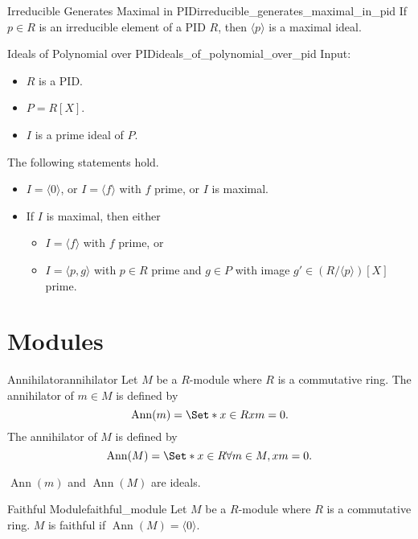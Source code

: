 \documentclass{article}
\begin{document}
\begin{proposition}{Irreducible Generates Maximal in PID}{irreducible_generates_maximal_in_pid}
    If $p\in R$ is an irreducible element of a PID $R$, then $\langle p \rangle$ is a maximal ideal.
\end{proposition}

\begin{theorem}{Ideals of Polynomial over PID}{ideals_of_polynomial_over_pid}
    Input:
    \begin{itemize}
        \item $R$ is a PID.
        \item $P = R[X]$.
        \item $I$ is a prime ideal of $P$.
    \end{itemize}
    The following statements hold.
    \begin{itemize}
        \item $I = \langle 0 \rangle$, or $I = \langle f \rangle$ with $f$ prime, or $I$ is maximal.
        \item If $I$ is maximal, then either
        \begin{itemize}
            \item $I = \langle f \rangle$ with $f$ prime, or
            \item $I = \langle p, g \rangle$ with $p\in R$ prime and $g\in P$ with image $g'\in (R/\langle p \rangle)[X]$ prime.
        \end{itemize}
    \end{itemize}
\end{theorem}

\section{Modules}

\begin{definition}{Annihilator}{annihilator}
    Let $M$ be a $R$-module where $R$ is a commutative ring.
    The annihilator of $m\in M$ is defined by
    \[ \operatorname{Ann}(m) = \Set*{x\in R}{xm = 0}. \]
    The annihilator of $M$ is defined by
    \[ \operatorname{Ann}(M) = \Set*{x\in R}{\forall m\in M, xm = 0}. \]
\end{definition}

$\operatorname{Ann}(m)$ and $\operatorname{Ann}(M)$ are ideals.

\begin{definition}{Faithful Module}{faithful_module}
    Let $M$ be a $R$-module where $R$ is a commutative ring.
    $M$ is faithful if $\operatorname{Ann}(M) = \langle 0 \rangle$.
\end{definition}
\end{document}

